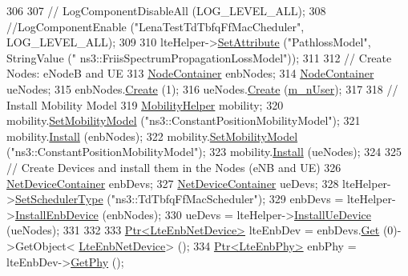 \begin{DoxyCode}
306 
307 \textcolor{comment}{//   LogComponentDisableAll (LOG\_LEVEL\_ALL);}
308   \textcolor{comment}{//LogComponentEnable ("LenaTestTdTbfqFfMacCheduler", LOG\_LEVEL\_ALL);}
309    
310   lteHelper->\hyperlink{classns3_1_1ObjectBase_ac60245d3ea4123bbc9b1d391f1f6592f}{SetAttribute} (\textcolor{stringliteral}{"PathlossModel"}, StringValue (\textcolor{stringliteral}{"
      ns3::FriisSpectrumPropagationLossModel"}));
311 
312   \textcolor{comment}{// Create Nodes: eNodeB and UE}
313   \hyperlink{classns3_1_1NodeContainer}{NodeContainer} enbNodes;
314   \hyperlink{classns3_1_1NodeContainer}{NodeContainer} ueNodes;
315   enbNodes.\hyperlink{classns3_1_1NodeContainer_a787f059e2813e8b951cc6914d11dfe69}{Create} (1);
316   ueNodes.\hyperlink{classns3_1_1NodeContainer_a787f059e2813e8b951cc6914d11dfe69}{Create} (\hyperlink{classLenaTdTbfqFfMacSchedulerTestCase1_a0b3a76f968db806b6d197452881f6cc4}{m\_nUser});
317 
318   \textcolor{comment}{// Install Mobility Model}
319   \hyperlink{classns3_1_1MobilityHelper}{MobilityHelper} mobility;
320   mobility.\hyperlink{classns3_1_1MobilityHelper_a030275011b6f40682e70534d30280aba}{SetMobilityModel} (\textcolor{stringliteral}{"ns3::ConstantPositionMobilityModel"});
321   mobility.\hyperlink{classns3_1_1MobilityHelper_a07737960ee95c0777109cf2994dd97ae}{Install} (enbNodes);
322   mobility.\hyperlink{classns3_1_1MobilityHelper_a030275011b6f40682e70534d30280aba}{SetMobilityModel} (\textcolor{stringliteral}{"ns3::ConstantPositionMobilityModel"});
323   mobility.\hyperlink{classns3_1_1MobilityHelper_a07737960ee95c0777109cf2994dd97ae}{Install} (ueNodes);
324 
325   \textcolor{comment}{// Create Devices and install them in the Nodes (eNB and UE)}
326   \hyperlink{classns3_1_1NetDeviceContainer}{NetDeviceContainer} enbDevs;
327   \hyperlink{classns3_1_1NetDeviceContainer}{NetDeviceContainer} ueDevs;
328   lteHelper->\hyperlink{classns3_1_1LteHelper_a8f86e55b8b80a81732c4b2df00fb25d5}{SetSchedulerType} (\textcolor{stringliteral}{"ns3::TdTbfqFfMacScheduler"});
329   enbDevs = lteHelper->\hyperlink{classns3_1_1LteHelper_a5e009ad35ef85f46b5a6099263f15a03}{InstallEnbDevice} (enbNodes);
330   ueDevs = lteHelper->\hyperlink{classns3_1_1LteHelper_ac9cd932d7de92811cfa953c2e3b2fc9f}{InstallUeDevice} (ueNodes);
331 
332 
333   \hyperlink{classns3_1_1Ptr}{Ptr<LteEnbNetDevice>} lteEnbDev = enbDevs.\hyperlink{classns3_1_1NetDeviceContainer_a677d62594b5c9d2dea155cc5045f4d0b}{Get} (0)->GetObject<
      \hyperlink{classns3_1_1LteEnbNetDevice}{LteEnbNetDevice}> ();
334   \hyperlink{classns3_1_1Ptr}{Ptr<LteEnbPhy>} enbPhy = lteEnbDev->\hyperlink{classns3_1_1LteEnbNetDevice_a58db72130e0740f16a5e03b22e4a10a4}{GetPhy} ();

\end{DoxyCode}
